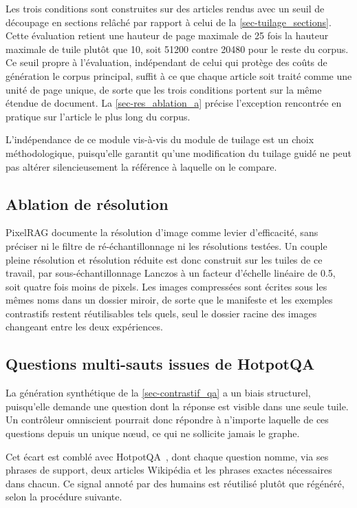 Les trois conditions sont construites sur des articles rendus avec un seuil de
découpage en sections relâché par rapport à celui de la
\cref{sec-tuilage_sections}. Cette évaluation retient une hauteur de page maximale
de \num{25} fois la hauteur maximale de tuile plutôt que \num{10}, soit
\SI{51200}{\pixel} contre \SI{20480}{\pixel} pour le reste du corpus. Ce seuil
propre à l'évaluation, indépendant de celui qui protège des coûts de génération le
corpus principal, suffit à ce que chaque article soit traité comme une unité de
page unique, de sorte que les trois conditions portent sur la même étendue de
document. La \cref{sec-res_ablation_a} précise l'exception rencontrée en pratique
sur l'article le plus long du corpus.
 
L'indépendance de ce module vis-à-vis du module de tuilage est un choix
méthodologique, puisqu'elle garantit qu'une modification du tuilage guidé ne peut
pas altérer silencieusement la référence à laquelle on le compare.
 
\subsection{Ablation de résolution}
\label{sec-protocole_resolution}
 
PixelRAG documente la résolution d'image comme levier d'efficacité, sans préciser
ni le filtre de ré-échantillonnage ni les résolutions testées. Un couple pleine
résolution et résolution réduite est donc construit sur les tuiles de ce travail,
par sous-échantillonnage Lanczos à un facteur d'échelle linéaire de \num{0.5}, soit
quatre fois moins de pixels. Les images compressées sont écrites sous les mêmes
noms dans un dossier miroir, de sorte que le manifeste et les exemples contrastifs
restent réutilisables tels quels, seul le dossier racine des images changeant entre
les deux expériences.
 
\subsection{Questions multi-sauts issues de HotpotQA}
\label{sec-protocole_multihop}
 
La génération synthétique de la \cref{sec-contrastif_qa} a un biais structurel,
puisqu'elle demande une question dont la réponse est visible dans une seule tuile.
Un contrôleur omniscient pourrait donc répondre à n'importe laquelle de ces
questions depuis un unique nœud, ce qui ne sollicite jamais le graphe.
 
Cet écart est comblé avec HotpotQA~\citep{hotpotqa2018}, dont chaque question
nomme, via ses phrases de support, deux articles Wikipédia et les phrases exactes
nécessaires dans chacun. Ce signal annoté par des humains est réutilisé plutôt que
régénéré, selon la procédure suivante.
 
